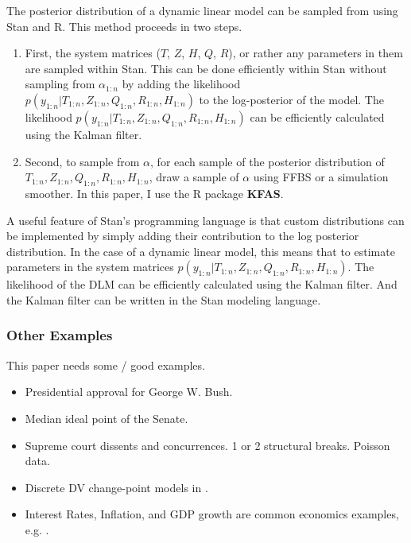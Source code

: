 \documentclass{article}
\begin{document}
The posterior distribution of a dynamic linear model can be sampled from using Stan and R.
This method proceeds in two steps.
\begin{enumerate}
\item First, the system matrices ($T$, $Z$, $H$, $Q$, $R$), or rather any parameters in them are sampled within Stan. This can be done efficiently within Stan without sampling from $\alpha_{1:n}$ by adding the likelihood $p(y_{1:n} | T_{1:n}, Z_{1:n}, Q_{1:n}, R_{1:n}, H_{1:n})$ to the log-posterior of the model.
The likelihood $p(y_{1:n} | T_{1:n}, Z_{1:n}, Q_{1:n}, R_{1:n}, H_{1:n})$ can be efficiently calculated using the Kalman filter.
\item Second, to sample from $\alpha$, for each sample of the posterior distribution of $T_{1:n}, Z_{1:n}, Q_{1:n}, R_{1:n}, H_{1:n}$, draw a sample of $\alpha$ using FFBS or a simulation smoother. In this paper, I use the R package \textbf{KFAS}.
\end{enumerate}

A useful feature of Stan's programming language is that custom distributions can be implemented by simply adding their contribution to the log posterior distribution.
In the case of a dynamic linear model, this means that to estimate parameters in the system matrices  $p(y_{1:n} | T_{1:n}, Z_{1:n}, Q_{1:n}, R_{1:n}, H_{1:n})$.
The likelihood of the DLM can be efficiently calculated using the Kalman filter. 
And the Kalman filter can be written in the Stan modeling language.

\subsubsection{Other Examples}

This paper needs some / good examples.

\begin{itemize}
\item Presidential approval for George W. Bush. \parencites{RatkovicEng2010}
\item Median ideal point of the Senate. \parencites{RatkovicEng2010}
\item Supreme court dissents and concurrences. 1 or 2 structural breaks. Poisson data. \parencite{CalderiaZorn1998}
\item Discrete DV change-point models in \parencite{spirling2007bayesian}.
\item Interest Rates, Inflation, and GDP growth are common economics examples, e.g. \textcite{GiordaniKohn2008}.
\end{itemize}
\end{document}
